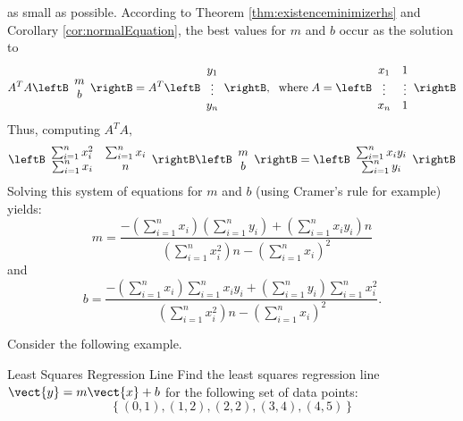 as small as possible. According to Theorem \ref{thm:existenceminimizerhs} and
Corollary \ref{cor:normalEquation}, the best values for $m$ and $b$ occur as the
solution to 
\begin{equation*}
A^{T}A\leftB 
\begin{array}{c}
m \\ 
b
\end{array}
\rightB =A^{T}\leftB 
\begin{array}{c}
y_{1} \\ 
\vdots \\ 
y_{n}
\end{array}
\rightB ,\ \;\mbox{where}\; A=\leftB
\begin{array}{cc}
x_{1} & 1 \\ 
\vdots & \vdots \\ 
x_{n} & 1
\end{array}
\rightB 
\end{equation*}
Thus, computing $A^{T}A,$ 
\begin{equation*}
\leftB 
\begin{array}{cc}
\sum_{i=1}^{n}x_{i}^{2} & \sum_{i=1}^{n}x_{i} \\ 
\sum_{i=1}^{n}x_{i} & n
\end{array}
\rightB \leftB 
\begin{array}{c}
m \\ 
b
\end{array}
\rightB =\leftB 
\begin{array}{c}
\sum_{i=1}^{n}x_{i}y_{i} \\ 
\sum_{i=1}^{n}y_{i}
\end{array}
\rightB
\end{equation*}
Solving this system of equations for $m$ and $b$ (using Cramer's rule for example) yields: 
\begin{equation*}
m=
\frac{-\left( \sum_{i=1}^{n}x_{i}\right) \left( \sum_{i=1}^{n}y_{i}\right)
+\left( \sum_{i=1}^{n}x_{i}y_{i}\right) n}{\left(
\sum_{i=1}^{n}x_{i}^{2}\right) n-\left( \sum_{i=1}^{n}x_{i}\right) ^{2}}
\end{equation*}
and 
\begin{equation*}
b=\frac{-\left( \sum_{i=1}^{n}x_{i}\right) \sum_{i=1}^{n}x_{i}y_{i}+\left(
\sum_{i=1}^{n}y_{i}\right) \sum_{i=1}^{n}x_{i}^{2}}{\left(
\sum_{i=1}^{n}x_{i}^{2}\right) n-\left( \sum_{i=1}^{n}x_{i}\right) ^{2}}.
\end{equation*}

Consider the following example.

\begin{example}{Least Squares Regression Line}\label{exa:leastSquaresLine}
Find the least squares regression line $\vect{y}=m\vect{x}+b$ for the following set of data points:
\[ \left\{ (0,1), (1,2), (2,2), (3,4), (4,5) \right\} \]
\end{example}

